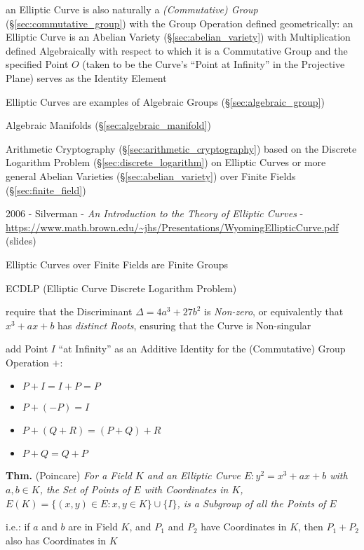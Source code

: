 an Elliptic Curve is also naturally a \emph{(Commutative) Group}
(\S\ref{sec:commutative_group}) with the Group Operation defined geometrically:
an Elliptic Curve is an Abelian Variety (\S\ref{sec:abelian_variety}) with
Multiplication defined Algebraically with respect to which it is a Commutative
Group and the specified Point $O$ (taken to be the Curve's ``Point at Infinity''
in the Projective Plane) serves as the Identity Element

Elliptic Curves are examples of Algebraic Groups (\S\ref{sec:algebraic_group})

\fist Algebraic Manifolds (\S\ref{sec:algebraic_manifold})

\fist Arithmetic Cryptography (\S\ref{sec:arithmetic_cryptography}) based on
the Discrete Logarithm Problem (\S\ref{sec:discrete_logarithm}) on Elliptic
Curves or more general Abelian Varieties (\S\ref{sec:abelian_variety}) over
Finite Fields (\S\ref{sec:finite_field})

\asterism

2006 - Silverman - \emph{An Introduction to the Theory of Elliptic Curves} -
\url{https://www.math.brown.edu/~jhs/Presentations/WyomingEllipticCurve.pdf}
(slides)

Elliptic Curves over Finite Fields are Finite Groups

ECDLP (Elliptic Curve Discrete Logarithm Problem)

require that the Discriminant $\Delta = 4a^3 + 27b^2$ is \emph{Non-zero}, or
equivalently that $x^3 + ax + b$ has \emph{distinct Roots}, ensuring that the
Curve is Non-singular

add Point $I$ ``at Infinity'' as an Additive Identity for the (Commutative)
Group Operation $+$:
\begin{itemize}
  \item $P + I = I + P = P$
  \item $P + (-P) = I$
  \item $P + (Q + R) = (P + Q) + R$
  \item $P + Q = Q + P$
\end{itemize}

\textbf{Thm.} (Poincare) \emph{For a Field $K$ and an Elliptic Curve
  $E : y^2 = x^3 + ax + b$ with $a, b \in K$, the Set of Points of $E$ with
  Coordinates in $K$, $E(K) = \{ (x,y) \in E : x, y \in K \} \cup \{ I \}$,
  is a Subgroup of all the Points of $E$}

i.e.: if $a$ and $b$ are in Field $K$, and $P_1$ and $P_2$ have Coordinates in
$K$, then $P_1 + P_2$ also has Coordinates in $K$

